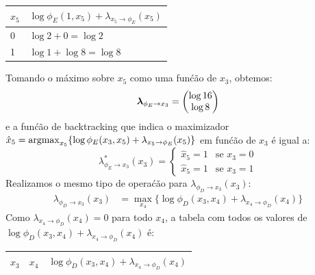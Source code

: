 \begin{exenumerate}
\begin{solution}
\begin{center}
\begin{tabular}{ll}
                \bottomrule
            \end{tabular}
            \hspace{3ex}
            \begin{tabular}{ll}
                \toprule
                $x_5$ &  $\log \phi_E(1, x_5) + \lambda_{x_5 \to \phi_E}(x_5)$\\
                \midrule
                0  &  $\log 2 + 0 = \log 2$\\
                1  &  $\log 1 + \log 8 = \log 8$\\
                \bottomrule
            \end{tabular}
        \end{center}
        Tomando o m\'aximo sobre $x_5$ como uma fun\'c\~ao de $x_3$, obtemos:
        \begin{equation}
            \boldsymbol{\lambda}_{\phi_E \to x_3} = \begin{pmatrix}
                \log 16\\
                \log 8
            \end{pmatrix}
        \end{equation}
        e a fun\'c\~ao de backtracking que indica o maximizador
        $\hat{x}_5 = \operatorname*{\mathrm{argmax}}_{x_5} \{ \log \phi_E(x_3, x_5) + \lambda_{x_5 \to \phi_E}(x_5) \}$ em fun\'c\~ao de $x_3$ \'e igual a:
        \begin{equation}
            \lambda^*_{\phi_E \to x_3}(x_3) = \begin{cases}
                \hat{x}_5=1 & \text{se } x_3= 0\\
                \hat{x}_5=1 & \text{se } x_3= 1
            \end{cases}
        \end{equation}
        Realizamos o mesmo tipo de opera\'c\~ao para $\lambda_{\phi_D \to x_3}(x_3)$:
        \begin{align}
            \lambda_{\phi_D \to x_3}(x_3) & = \max_{x_4} \{ \log \phi_D(x_3, x_4) + \lambda_{x_4 \to \phi_D}(x_4) \}
        \end{align}
        Como $\lambda_{x_4 \to \phi_D}(x_4)=0$ para todo $x_4$, a tabela com todos os valores de $\log \phi_D(x_3, x_4) + \lambda_{x_4 \to \phi_D}(x_4)$ \'e:
        \begin{center}
            \begin{tabular}{lll}
                \toprule
                $x_3$ & $x_4$ & $\log \phi_D(x_3, x_4) + \lambda_{x_4 \to \phi_D}(x_4)$ \\
                \midrule

\end{tabular}
\end{center}
\end{solution}
\end{exenumerate}
